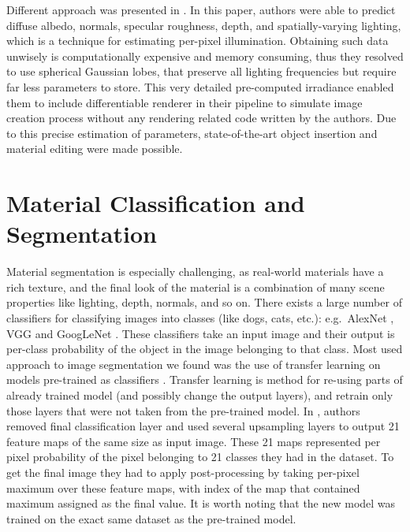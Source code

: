 \newline
Different approach was presented in \cite{li-inverse-rendering}. In this paper, authors were able to predict diffuse albedo, normals, specular roughness, depth, and spatially-varying lighting, which is a technique for estimating per-pixel illumination. Obtaining such data unwisely is computationally expensive and memory consuming, thus they resolved to use spherical Gaussian lobes, that preserve all lighting frequencies but require far less parameters to store. This very detailed pre-computed irradiance enabled them to include differentiable renderer in their pipeline to simulate image creation process without any rendering related code written by the authors. Due to this precise estimation of parameters, state-of-the-art object insertion and material editing were made possible.
\section{Material Classification and Segmentation}
Material segmentation is especially challenging, as real-world materials have a rich texture, and the final look of the material is a combination of many scene properties like lighting, depth, normals, and so on.
\newline
There exists a large number of classifiers for classifying images into classes (like dogs, cats, etc.): e.g.\ AlexNet \cite{alexnet}, VGG \cite{vgg} and GoogLeNet \cite{googlenet}. These classifiers take an input image and their output is per-class probability of the object in the image belonging to that class. Most used approach to image segmentation we found was the use of transfer learning on models pre-trained as classifiers \cite{fcn} \cite{material-recognition}. Transfer learning is method for re-using parts of already trained model (and possibly change the output layers), and retrain only those layers that were not taken from the pre-trained model.
\newline
In \cite{fcn}, authors removed final classification layer and used several upsampling layers to output 21 feature maps of the same size as input image. These 21 maps represented per pixel probability of the pixel belonging to 21 classes they had in the dataset. To get the final image they had to apply post-processing by taking per-pixel maximum over these feature maps, with index of the map that contained maximum assigned as the final value. It is worth noting that the new model was trained on the exact same dataset as the pre-trained model.
\newline
